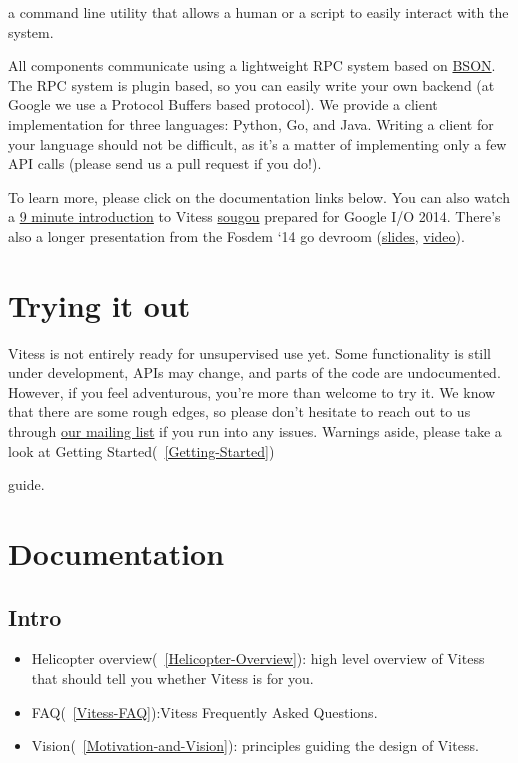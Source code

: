 a command line utility that allows a human or a script to easily
interact with the system.

All components communicate using a lightweight RPC system based on
\href{http://bsonspec.org/}{BSON}. The RPC system is plugin based, so you can easily
write your own backend (at Google we use a Protocol Buffers based protocol). We
provide a client implementation for three languages: Python, Go, and Java.
Writing a client for your language should not be difficult, as it's a matter of
implementing only a few API calls (please send us a pull request if you do!).

To learn more, please click on the documentation links below.
You can also watch a \href{https://www.youtube.com/watch?v=midJ6b1LkA0}{9 minute introduction}
to Vitess \href{https://github.com/sougou}{sougou} prepared for Google I/O 2014.
There's also a longer presentation from the Fosdem `14 go devroom
(\href{https://github.com/youtube/vitess/blob/master/doc/Vitess2014.pdf?raw=true}{slides},
\href{http://youtu.be/qATTTSg6zXk}{video}).

\section{Trying it out}\hypertarget{trying-it-out}{}\label{trying-it-out}

Vitess is not entirely ready for unsupervised use yet. Some functionality is
still under development, APIs may change, and parts of the code are
undocumented. However, if you feel adventurous, you're more than welcome to try
it. We know that there are some rough edges, so please don't hesitate to reach out
to us through \href{https://groups.google.com/forum/\#!forum/vitess}{our mailing list}
if you run into any issues. Warnings aside, please take a look at Getting Started(~\ref{Getting-Started})

guide.

\section{Documentation}\hypertarget{documentation}{}\label{documentation}

\subsection{Intro}\hypertarget{intro}{}\label{intro}

\begin{itemize}
\item Helicopter overview(~\ref{Helicopter-Overview}):  high level overview of Vitess that should tell you whether Vitess is for you.
\item FAQ(~\ref{Vitess-FAQ}):Vitess Frequently Asked Questions.
\item Vision(~\ref{Motivation-and-Vision}): principles guiding the design of Vitess.
\end{itemize}

